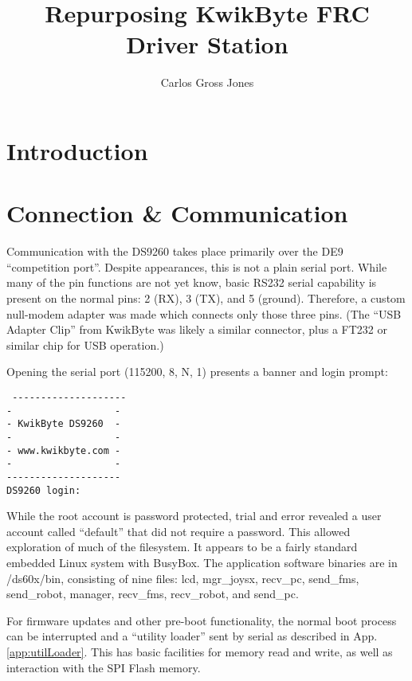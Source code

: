 \documentclass[]{article}
\title{Repurposing KwikByte FRC Driver Station}
\author{Carlos Gross Jones}
\begin{document}
\maketitle

\begin{abstract}

\end{abstract}

\section{Introduction}
\section{Connection \& Communication}
\par Communication with the DS9260 takes place primarily over the DE9 ``competition port''. Despite appearances, this is not a plain serial port. While many of the pin functions are not yet know, basic RS232 serial capability is present on the normal pins: 2 (RX), 3 (TX), and 5 (ground). Therefore, a custom null-modem adapter was made which connects only those three pins. (The ``USB Adapter Clip'' from KwikByte was likely a similar connector, plus a FT232 or similar chip for USB operation.)
\par Opening the serial port (115200, 8, N, 1) presents a banner and login prompt:
\begin{verbatim}
 --------------------
-                  -
- KwikByte DS9260  -
-                  -
- www.kwikbyte.com -
-                  -
--------------------
DS9260 login:
\end{verbatim}
While the root account is password protected, trial and error revealed a user account called ``default'' that did not require a  password. This allowed exploration of much of the filesystem. It appears to be a fairly standard embedded Linux system with BusyBox. The application software binaries are in /ds60x/bin, consisting of nine files: lcd, mgr\_joysx, recv\_pc, send\_fms, send\_robot, manager, recv\_fms, recv\_robot, and send\_pc.
\par For firmware updates and other pre-boot functionality, the normal boot process can be interrupted and a ``utility loader'' sent by serial as described in App. \ref{app:utilLoader}. This has basic facilities for memory read and write, as well as interaction with the SPI Flash memory.
\end{document}
